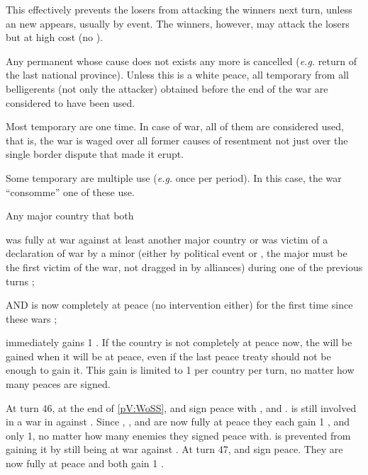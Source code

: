 \begin{designnote}
  This effectively prevents the losers from attacking the winners next turn,
  unless an new \CB appears, usually by event. The winners, however, may
  attack the losers but at high cost (no \CB).
\end{designnote}

\bparag Any permanent \CB whose cause does not exists any more is cancelled
(\emph{e.g.} return of the last national province).
\bparag Unless this is a white peace, all temporary \CB from all belligerents
(not only the attacker) obtained before the end of the war are considered to
have been used.

\begin{designnote}[Temporary \CB]
  Most temporary \CB are one time. In case of war, all of them are considered
  used, that is, the war is waged over all former causes of resentment not
  just over the single border dispute that made it erupt.

  Some temporary \CB are multiple use (\emph{e.g.} once per period). In this
  case, the war ``consomme'' one of these use.
\end{designnote}

\label{chPeace:Peace and Stability}
Any major country that both
\begin{modlist}
\item was fully at war against at least another major country or was victim of
  a declaration of war by a minor (either by political event or \RD, the major
  must be the first victim of the war, not dragged in by alliances) during one
  of the previous turns ;
\item[AND] is now completely at peace (no intervention either) for the first
  time since these wars ;
\end{modlist}
immediately gains 1 \STAB.
\bparag If the country is not completely at peace now, the \STAB will be
gained when it will be at peace, even if the last peace treaty should not be
enough to gain it.
\bparag This gain is limited to 1 \STAB per country per turn, no matter how
many peaces are signed.

\begin{exemple}
  At turn 46, at the end of \ref{pV:WoSS}, \FRA and \HIS sign peace with \ANG,
  \HOL and \AUS. \AUS is still involved in a war in \paysHongrie against
  \TUR. Since \FRA, \HIS, \ANG and \HOL are now fully at peace they each gain
  1 \STAB, and only 1, no matter how many enemies they signed peace with. \AUS
  is prevented from gaining it by still being at war against \TUR. At turn 47,
  \AUS and \TUR sign peace. They are now fully at peace and both gain 1 \STAB.
\end{exemple}

